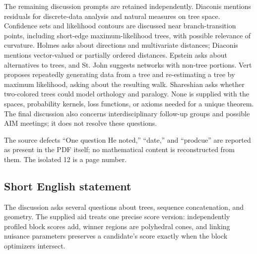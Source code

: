 \documentclass[11pt]{article}
\begin{document}
The remaining discussion prompts are retained independently. Diaconis mentions residuals for discrete-data analysis and natural measures on tree space. Confidence sets and likelihood contours are discussed near branch-transition points, including short-edge maximum-likelihood trees, with possible relevance of curvature. Holmes asks about directions and multivariate distances; Diaconis mentions vector-valued or partially ordered distances. Epstein asks about alternatives to trees, and St. John suggests networks with non-tree portions. Vert proposes repeatedly generating data from a tree and re-estimating a tree by maximum likelihood, asking about the resulting walk. Shareshian asks whether two-colored trees could model orthology and paralogy. None is supplied with the spaces, probability kernels, loss functions, or axioms needed for a unique theorem. The final discussion also concerns interdisciplinary follow-up groups and possible AIM meetings; it does not resolve these questions.

The source defects ``One question He noted,'' ``date,'' and ``prodcue'' are reported as present in the PDF itself; no mathematical content is reconstructed from them. The isolated 12 is a page number.
\subsection{Short English statement}
The discussion asks several questions about trees, sequence concatenation, and geometry. The supplied aid treats one precise score version: independently profiled block scores add, winner regions are polyhedral cones, and linking nuisance parameters preserves a candidate's score exactly when the block optimizers intersect.
\end{document}
